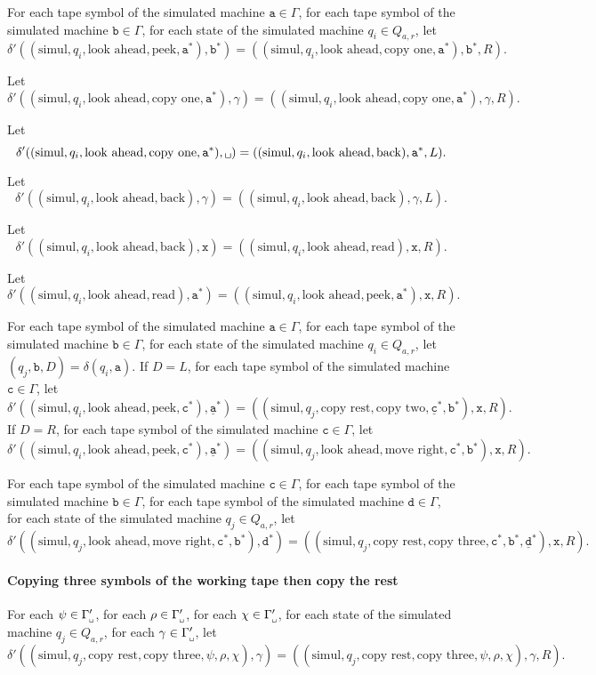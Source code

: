 \documentclass{article}
\newcommand{\obullet}[1]{\ensuremath{#1^*}}
\newcommand{\0}{\texttt{\textvisiblespace}}
\newcommand{\°}{\obullet{\0}}
\newcommand{\A}{\obullet{\s}}
\newcommand{\D}{\obullet{\d}}
\newcommand{\Q}{\obullet{\w}}
\renewcommand{\C}{\obullet{\y}}
\newcommand{\HA}{\obullet{\underline{\s}}}
\newcommand{\HD}{\obullet{\underline{\d}}}
\newcommand{\HC}{\obullet{\underline{\y}}}
\newcommand{\s}{\texttt{a}}
\newcommand{\w}{\texttt{b}}
\newcommand{\y}{\texttt{c}}
\renewcommand{\d}{\texttt{d}}
\newcommand{\X}{\texttt{x}}
\newcommand{\gpwb}{\Gamma'_{\0{}}}
\newcommand{\qwar}{Q_{a,r}}
\begin{document}
For each tape symbol of the simulated machine $\s \in \Gamma$,
for each tape symbol of the simulated machine $\w \in \Gamma$,
for each state of the simulated machine $q_i \in \qwar$,
let $$\delta'((\text{simul}, q_i, \text{look ahead}, \text{peek}, \A),\Q)
=((\text{simul}, q_i, \text{look ahead}, \text{copy one}, \A), \Q, R).$$

Let $$\delta'((\text{simul}, q_i, \text{look ahead}, \text{copy one}, \A),\gamma)
=((\text{simul}, q_i, \text{look ahead}, \text{copy one}, \A), \gamma, R).$$

Let $$\delta'((\text{simul}, q_i, \text{look ahead}, \text{copy one}, \A),\0{})
=((\text{simul}, q_i, \text{look ahead}, \text{back}), \A, L).$$

Let $$\delta'((\text{simul}, q_i, \text{look ahead}, \text{back}),\gamma)
=((\text{simul}, q_i, \text{look ahead}, \text{back}), \gamma, L).$$

Let $$\delta'((\text{simul}, q_i, \text{look ahead}, \text{back}),\X)
=((\text{simul}, q_i, \text{look ahead}, \text{read}), \X, R).$$

Let $$\delta'((\text{simul}, q_i, \text{look ahead}, \text{read}),\A)
=((\text{simul}, q_i, \text{look ahead}, \text{peek}, \A), \X, R).$$

For each tape symbol of the simulated machine $\s \in \Gamma$,
for each tape symbol of the simulated machine $\w \in \Gamma$,
for each state of the simulated machine $q_i \in \qwar$,
let $(q_j, \w, D)=\delta(q_i,\s)$.
If $D=L$, for each tape symbol of the simulated machine $\y \in \Gamma$,
let $$\delta'((\text{simul}, q_i, \text{look ahead}, \text{peek}, \C),\HA)
=((\text{simul}, q_j, \text{copy rest}, \text{copy two}, \HC, \Q), \X, R).$$
%
If $D=R$, for each tape symbol of the simulated machine $\y \in \Gamma$,
let $$\delta'((\text{simul}, q_i, \text{look ahead}, \text{peek}, \C),\HA)
=((\text{simul}, q_j, \text{look ahead}, \text{move right}, \C, \Q), \X, R).$$

For each tape symbol of the simulated machine $\y \in \Gamma$,
for each tape symbol of the simulated machine $\w \in \Gamma$,
for each tape symbol of the simulated machine $\d \in \Gamma$,
for each state of the simulated machine $q_j \in \qwar$,
let $$\delta'((\text{simul}, q_j, \text{look ahead}, \text{move right}, \C, \Q),\D)
=((\text{simul}, q_j, \text{copy rest}, \text{copy three}, \C, \Q, \HD), \X, R).$$

\paragraph{Copying three symbols of the working tape then copy the rest}
For each $\psi \in \gpwb$,
for each $\rho \in \gpwb$,
for each $\chi \in \gpwb$,
for each state of the simulated machine $q_j \in \qwar$,
for each $\gamma \in \gpwb$,
let $$\delta'((\text{simul}, q_j, \text{copy rest}, \text{copy three}, \psi, \rho, \chi), \gamma)
= ((\text{simul}, q_j, \text{copy rest}, \text{copy three}, \psi, \rho, \chi), \gamma, R).$$
\end{document}
